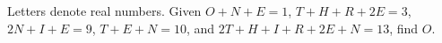 Letters denote real numbers. Given $ O+N+E=1 $, $ T+H+R+2E=3 $, $ 2N+I+E=9 $, $ T+E+N=10 $, and $ 2T+H+I+R+2E+N=13 $, find $ O $.
